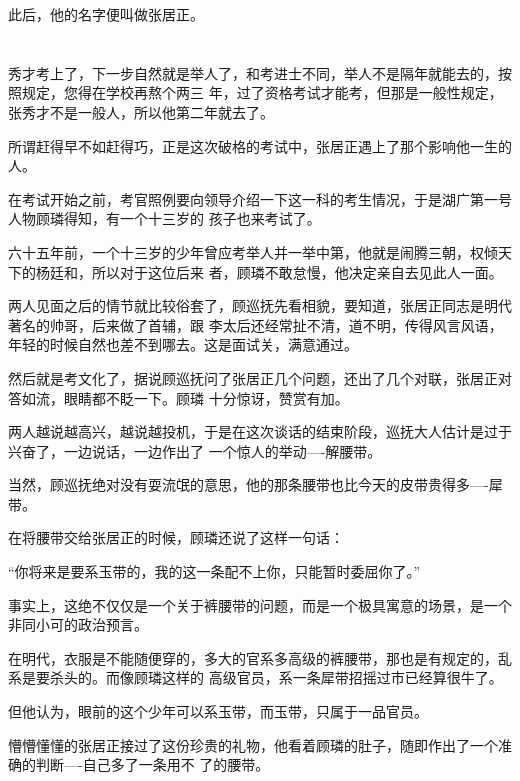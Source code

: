 \documentclass[11pt,a4paper,onecolumn]{article}
\begin{document}
此后，他的名字便叫做张居正。

\section[\thesection]{}

秀才考上了，下一步自然就是举人了，和考进士不同，举人不是隔年就能去的，按照规定，您得在学校再熬个两三
年，过了资格考试才能考，但那是一般性规定，张秀才不是一般人，所以他第二年就去了。

所谓赶得早不如赶得巧，正是这次破格的考试中，张居正遇上了那个影响他一生的人。

在考试开始之前，考官照例要向领导介绍一下这一科的考生情况，于是湖广第一号人物顾璘得知，有一个十三岁的
孩子也来考试了。

六十五年前，一个十三岁的少年曾应考举人并一举中第，他就是闹腾三朝，权倾天下的杨廷和，所以对于这位后来
者，顾璘不敢怠慢，他决定亲自去见此人一面。

两人见面之后的情节就比较俗套了，顾巡抚先看相貌，要知道，张居正同志是明代著名的帅哥，后来做了首辅，跟
李太后还经常扯不清，道不明，传得风言风语，年轻的时候自然也差不到哪去。这是面试关，满意通过。

然后就是考文化了，据说顾巡抚问了张居正几个问题，还出了几个对联，张居正对答如流，眼睛都不眨一下。顾璘
十分惊讶，赞赏有加。

两人越说越高兴，越说越投机，于是在这次谈话的结束阶段，巡抚大人估计是过于兴奋了，一边说话，一边作出了
一个惊人的举动----解腰带。

当然，顾巡抚绝对没有耍流氓的意思，他的那条腰带也比今天的皮带贵得多----犀带。

在将腰带交给张居正的时候，顾璘还说了这样一句话：

``你将来是要系玉带的，我的这一条配不上你，只能暂时委屈你了。''

事实上，这绝不仅仅是一个关于裤腰带的问题，而是一个极具寓意的场景，是一个非同小可的政治预言。

在明代，衣服是不能随便穿的，多大的官系多高级的裤腰带，那也是有规定的，乱系是要杀头的。而像顾璘这样的
高级官员，系一条犀带招摇过市已经算很牛了。

但他认为，眼前的这个少年可以系玉带，而玉带，只属于一品官员。

懵懵懂懂的张居正接过了这份珍贵的礼物，他看着顾璘的肚子，随即作出了一个准确的判断----自己多了一条用不
了的腰带。

\section[\thesection]{}
\end{document}
